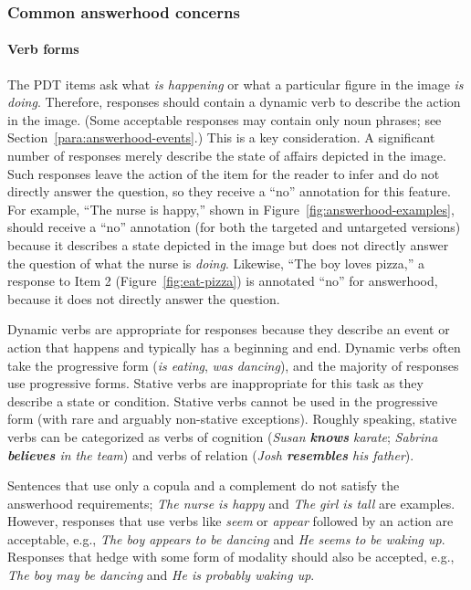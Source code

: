 \documentclass[12pt,notitlepage]{article}
\begin{document}
\subsubsection{Common answerhood concerns}

\paragraph{Verb forms} 
The PDT items ask what \textit{is happening} or what a particular figure in the image \textit{is doing}. Therefore, responses should contain a dynamic verb to describe the action in the image. (Some acceptable responses may contain only noun phrases; see Section~\ref{para:answerhood-events}.) This is a key consideration. A significant number of responses merely describe the state of affairs depicted in the image. Such responses leave the action of the item for the reader to infer and do not directly answer the question, so they receive a ``no'' annotation for this feature. For example, ``The nurse is happy,'' shown in Figure~\ref{fig:answerhood-examples}, should receive a ``no'' annotation (for both the targeted and untargeted versions) because it describes a state depicted in the image but does not directly answer the question of what the nurse is \textit{doing}. Likewise, ``The boy loves pizza,'' a response to Item 2 (Figure~\ref{fig:eat-pizza}) is annotated ``no'' for answerhood, because it does not directly answer the question.

Dynamic verbs are appropriate for responses because they describe an event or action that happens and typically has a beginning and end. Dynamic verbs often take the progressive form (\textit{is eating}, \textit{was dancing}), and the majority of responses use progressive forms. Stative verbs are inappropriate for this task as they describe a state or condition. Stative verbs cannot be used in the progressive form (with rare and arguably non-stative exceptions). Roughly speaking, stative verbs can be categorized as verbs of cognition (\textit{Susan \textbf{knows} karate}; \textit{Sabrina \textbf{believes} in the team}) and verbs of relation (\textit{Josh \textbf{resembles} his father}). 

Sentences that use only a copula and a complement do not satisfy the answerhood requirements; \textit{The nurse is happy} and \textit{The girl is tall} are examples. However, responses that use verbs like \textit{seem} or \textit{appear} followed by an action are acceptable, e.g., \textit{The boy appears to be dancing} and \textit{He seems to be waking up}. Responses that hedge with some form of modality should also be accepted, e.g., \textit{The boy may be dancing} and \textit{He is probably waking up}.
\end{document}
